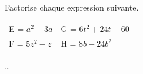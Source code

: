 \begin{exercice*}
    Factorise chaque expression suivante.

    \begin{tabular}{ll}
        E = $a^{2} - 3a$ & G = $6t^{2} + 24t - 60$ \\
        F = $5z^{2} - z$ & H = $8b - 24b^{2}$
    \end{tabular}
\end{exercice*}
\begin{corrige}
    \dots
\end{corrige}

